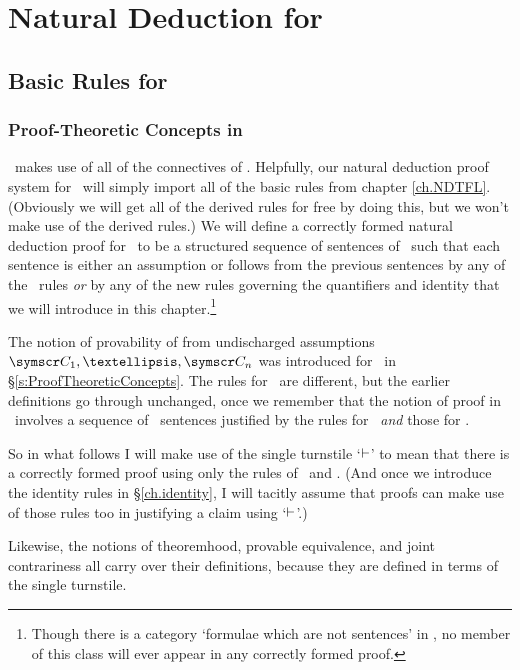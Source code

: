 \part{Natural Deduction for \FOL}
\label{ch.NDFOL}

\chapter{Basic Rules for \textnormal{\FOL}}\label{s:BasicFOL}

\section{Proof-Theoretic Concepts in \FOL}



\FOL\ makes use of all of the connectives of \TFL. Helpfully, our natural deduction proof system for \FOL\ will simply import all of the basic rules from chapter \ref{ch.NDTFL}. (Obviously we will get all of the derived rules for free by doing this, but we won't make use of the derived rules.) We will define a correctly formed natural deduction proof for \FOL\ to be a structured sequence of sentences of \FOL\ such that each sentence is either an assumption or follows from the previous sentences by any of the \TFL\ rules \emph{or} by any of the new rules governing the quantifiers and identity that we will introduce in this chapter.\footnote{Though there is a category `formulae which are not sentences' in \FOL, no member of this class will ever appear in any correctly formed proof.} 

The notion of provability of  from undischarged assumptions $\meta{C}_{1},…,\meta{C}_{n}$ was introduced for \TFL\ in §\ref{s:ProofTheoreticConcepts}. The rules for \FOL\ are different, but the earlier definitions go through unchanged, once we remember that the notion of proof in \FOL\ involves a sequence of \FOL\ sentences justified by the rules for \TFL\ \emph{and} those for \FOL. 

So in what follows I will make use of the single turnstile `$\vdash$' to mean that there is a correctly formed proof using only the rules of \TFL\ and \FOL. (And once we introduce the identity rules in §\ref{ch.identity}, I will tacitly assume that proofs can make use of those rules too in justifying a claim using `$\vdash$'.) 

Likewise, the notions of theoremhood, provable equivalence, and joint contrariness all carry over their definitions, because they are defined in terms of the single turnstile.



